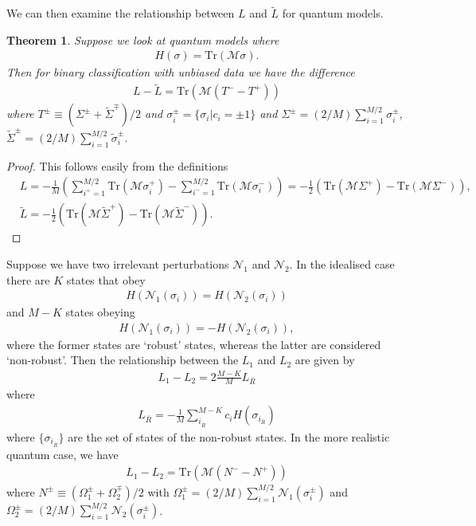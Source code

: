 \documentclass[onecolumn,prx, superscriptaddress,longbibliography,margin=1mm 11pt]{revtex4-2}
\newtheorem{theorem}{Theorem}
\begin{document}
We can then examine the relationship between $L$ and $\tilde{L}$ for quantum models. 
\begin{theorem}
Suppose we look at quantum models where
\begin{align}
    H(\sigma)=\text{Tr}(\mathcal{M}\sigma).
\end{align}
Then for binary classification with unbiased data we have the difference
\begin{align}
    L-\tilde{L}=\text{Tr}(\mathcal{M}(T^--T^+))
\end{align}
where $T^{\pm} \equiv (\Sigma^{\pm}+\tilde{\Sigma}^{\mp})/2$ and $\sigma_i^{\pm}=\{\sigma_i \vert c_i=\pm 1\}$ and $\Sigma^{\pm}=(2/M)\sum_{i=1}^{M/2}\sigma_i^{\pm}$, $\tilde{\Sigma}^{\pm}=(2/M)\sum_{i=1}^{M/2}\tilde{\sigma}_i^{\pm}$. 
\end{theorem}
\begin{proof}
   This follows easily from the definitions
\begin{align}
    &L=-\frac{1}{M}\left(\sum_{i^+=1}^{M/2}\text{Tr}(\mathcal{M}\sigma_i^+)-\sum_{i^-=1}^{M/2}\text{Tr}(\mathcal{M}\sigma_i^-)\right)=-\frac{1}{2}(\text{Tr}(\mathcal{M}\Sigma^+)-\text{Tr}(\mathcal{M}\Sigma^-)), \\
    & \tilde{L}=-\frac{1}{2}(\text{Tr}(\mathcal{M}\tilde{\Sigma}^+)-\text{Tr}(\mathcal{M}\tilde{\Sigma}^-)).
\end{align}
\end{proof}
Suppose we have two irrelevant perturbations $\mathcal{N}_1$ and $\mathcal{N}_2$. In the idealised case there are $K$ states that obey
\begin{align}
    H(\mathcal{N}_1(\sigma_i))=H(\mathcal{N}_2(\sigma_i))
\end{align}
and $M-K$ states obeying 
\begin{align}
    H(\mathcal{N}_1(\sigma_i))=-H(\mathcal{N}_2(\sigma_i)),
\end{align}
where the former states are `robust' states, whereas the latter are considered `non-robust'. Then the relationship between the $L_1$ and $L_2$ are given by 
\begin{align}
   L_1-L_2=2\frac{M-K}{M}L_{\bar{R}}
\end{align}
where 
\begin{align}
    L_{\bar{R}}=-\frac{1}{M}\sum_{i_{\bar{R}}}^{M-K} c_i H(\sigma_{i_{\bar{R}}})
\end{align}
where $\{\sigma_{i_{\bar{R}}}\}$ are the set of states of the non-robust states. In the more realistic quantum case, we have 
\begin{align}
    L_1-L_2=\text{Tr}(\mathcal{M}(N^--N^+))
\end{align}
where $N^{\pm}\equiv (\Omega_1^{\pm}+\Omega_2^{\mp})/2$ with $\Omega_1^{\pm}=(2/M)\sum_{i=1}^{M/2}\mathcal{N}_1(\sigma_i^{\pm})$ and $\Omega_2^{\pm}=(2/M)\sum_{i=1}^{M/2}\mathcal{N}_2(\sigma_i^{\pm})$. \\
\end{document}
